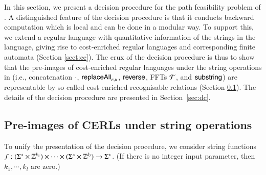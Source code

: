 

%

In this section, we present a decision procedure for the path feasibility problem of {\slint}. A distinguished feature of the decision procedure is that it conducts backward computation which is local and can be done in a modular way. To support this, we extend  a regular language with quantitative information of the strings in the language, giving rise to cost-enriched regular languages and corresponding finite automata (Section \ref{sect:ce}). The crux of the decision procedure is thus to %
show that the %
pre-images of cost-enriched regular languages under the string operations in {\slint} (i.e., concatenation $\cdot$, $\mathsf{replaceAll}_{e,u}$, $\mathsf{reverse}$, FFTs $\mathcal{T}$, and $\mathsf{substring}$) are representable by so called cost-enriched recognisable relations (Section \ref{sect:pre}). The details of the decision procedure are presented in Section~\ref{sec:dc}. 




\subsection{Pre-images of CERLs under string operations} \label{sect:pre}

To unify the presentation of the decision procedure, %
we consider string functions $f: (\Sigma^* \times \mathbb{Z}^{k_1}) \times \cdots \times (\Sigma^* \times \mathbb{Z}^{k_l}) \rightarrow \Sigma^*$. (If there is no integer input parameter, then $k_1,\cdots,k_l$ are zero.)  

